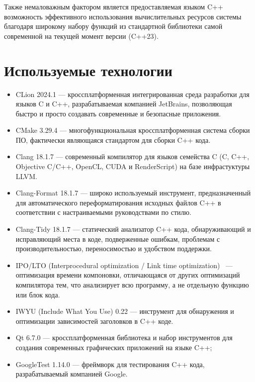 Также немаловажным фактором является предоставляемая языком C++ возможность эффективного использования вычислительных ресурсов системы благодаря широкому набору функций из стандартной библиотеки самой современной на текущей момент версии (C++23).

\section{Используемые технологии}

\begin{itemize}
	\item CLion 2024.1 \cite{clion} — кроссплатформенная интегрированная среда разработки для языков C и C++, разрабатываемая компанией JetBrains, позволяющая быстро и просто создавать современные и безопасные приложения.
	\item CMake 3.29.4 \cite{cmake} — многофункциональная кроссплатформенная система сборки ПО, фактически являющаяся стандартом для сборки C++ кода.
	\item Clang 18.1.7 \cite{clang} — современный компилятор для языков семейства C (C, C++, Objective C/C++, OpenCL, CUDA и RenderScript) на базе инфрастуктуры LLVM.
	\item Clang-Format 18.1.7 \cite{clang-format} — широко используемый инструмент, предназначенный для автоматического переформатирования исходных файлов C++ в соответствии с настраиваемыми руководствами по стилю.
	\item Clang-Tidy 18.1.7 \cite{clang-tidy} — статический анализатор C++ кода, обнаруживающий и исправляющий места в коде, подверженные ошибкам, проблемам с производительностью, переносимостью и удобством поддержки.
	\item IPO/LTO (Interprocedural optimization / Link time optimization) \cite{ipo-lto}~— оптимизация времени компоновки, отличающаяся от других оптимизаций компилятора тем, что анализирует всю программу, а не отдельную функцию или блок кода.
	\item IWYU (Include What You Use) 0.22 \cite{iwyu} — инструмент для обнаружения и оптимизации зависимостей заголовков в C++ коде.
	\item Qt 6.7.0 \cite{qt} — кроссплатформенная библиотека и набор инструментов для создания современных графических приложений на языке C++;
	\item GoogleTest 1.14.0 \cite{googletest} — фреймворк для тестирования C++ кода, разрабатываемый компанией Google.
\end{itemize}

